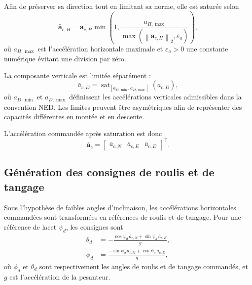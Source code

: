 \documentclass[11pt,a4paper,oneside]{report}
\newcommand{\vect}[1]{\bm{#1}}
\newcommand{\trans}{^{\mathsf T}}
\newcommand{\sat}{\operatorname{sat}}
\newcommand{\norm}[1]{\left\lVert#1\right\rVert}
\begin{document}
Afin de préserver sa direction tout en limitant sa norme, elle est saturée selon
\begin{equation}
	\bar{\vect a}_{c,H}
	=
	\vect a_{c,H}
	\min\left(
	1,
	\frac{a_{H,\max}}
	{\max\!\left(\norm{\vect a_{c,H}}_2,\varepsilon_a\right)}
	\right),
	\label{eq_horizontal_acceleration_saturation}
\end{equation}
où $a_{H,\max}$ est l'accélération horizontale maximale et $\varepsilon_a>0$ une constante numérique évitant une division par zéro.

La composante verticale est limitée séparément :
\begin{equation}
	\bar a_{c,D}
	=
	\sat_{[a_{D,\min},a_{D,\max}]}
	\left(a_{c,D}\right),
	\label{eq_vertical_acceleration_saturation}
\end{equation}
où $a_{D,\min}$ et $a_{D,\max}$ définissent les accélérations verticales admissibles dans la convention NED. Les limites peuvent être asymétriques afin de représenter des capacités différentes en montée et en descente.

L'accélération commandée après saturation est donc
\begin{equation}
	\bar{\vect a}_c
	=
	\begin{bmatrix}
		\bar a_{c,N} &
		\bar a_{c,E} &
		\bar a_{c,D}
	\end{bmatrix}\trans.
	\label{eq_saturated_acceleration_command}
\end{equation}

\subsection{Génération des consignes de roulis et de tangage}

Sous l'hypothèse de faibles angles d'inclinaison, les accélérations horizontales commandées sont transformées en références de roulis et de tangage. Pour une référence de lacet $\psi_d$, les consignes sont
\begin{subequations}
	\label{eq_desired_roll_pitch}
	\begin{align}
		\theta_d
		&=
		-\frac{
			\cos\psi_d\,\bar a_{c,N}
			+
			\sin\psi_d\,\bar a_{c,E}
		}{g},
		\\
		\phi_d
		&=
		\frac{
			-\sin\psi_d\,\bar a_{c,N}
			+
			\cos\psi_d\,\bar a_{c,E}
		}{g},
	\end{align}
\end{subequations}
où $\phi_d$ et $\theta_d$ sont respectivement les angles de roulis et de tangage commandés, et $g$ est l'accélération de la pesanteur.
\end{document}
